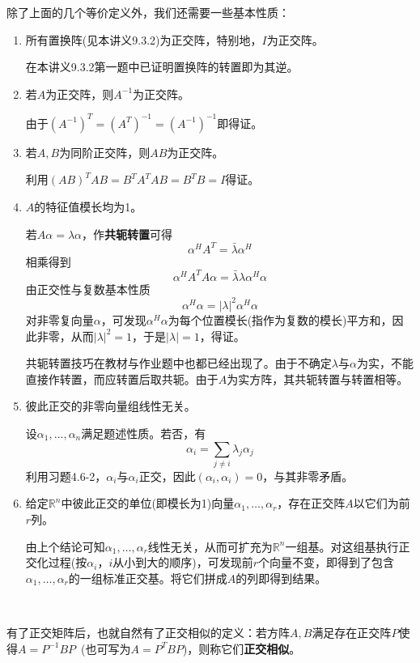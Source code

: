 \documentclass[a4paper,UTF8,fontset=windows]{ctexart}
\newcommand*{\note}{\noindent *}
\begin{document}
除了上面的几个等价定义外，我们还需要一些基本性质：
\begin{enumerate}
    \item 所有置换阵(见本讲义9.3.2)为正交阵，特别地，$I$为正交阵。
    
    在本讲义9.3.2第一题中已证明置换阵的转置即为其逆。

    \item 若$A$为正交阵，则$A^{-1}$为正交阵。
    
    由于$(A^{-1})^T=(A^T)^{-1}=(A^{-1})^{-1}$即得证。

    \item 若$A,B$为同阶正交阵，则$AB$为正交阵。
    
    利用$(AB)^TAB=B^TA^TAB=B^TB=I$得证。

    \item $A$的特征值模长均为1。
    
    若$A\alpha=\lambda\alpha$，作\textbf{共轭转置}可得
    $$\alpha^HA^T=\bar{\lambda}\alpha^H$$
    相乘得到
    $$\alpha^HA^TA\alpha=\bar{\lambda}\lambda\alpha^H\alpha$$
    由正交性与复数基本性质
    $$\alpha^H\alpha=|\lambda|^2\alpha^H\alpha$$
    对非零复向量$\alpha$，可发现$\alpha^H\alpha$为每个位置模长(指作为复数的模长)平方和，因此非零，从而$|\lambda|^2=1$，于是$|\lambda|=1$，得证。

    \note 共轭转置技巧在教材与作业题中也都已经出现了。由于不确定$\lambda$与$\alpha$为实，不能直接作转置，而应转置后取共轭。由于$A$为实方阵，其共轭转置与转置相等。

    \item 彼此正交的非零向量组线性无关。
    
    设$\alpha_1,\dots,\alpha_n$满足题述性质。若否，有
    $$\alpha_i=\sum_{j\ne i}\lambda_j\alpha_j$$
    利用习题4.6-2，$\alpha_i$与$\alpha_i$正交，因此$(\alpha_i,\alpha_i)=0$，与其非零矛盾。

    \item 给定$\mathbb{R}^n$中彼此正交的单位(即模长为1)向量$\alpha_1,\dots,\alpha_r$，存在正交阵$A$以它们为前$r$列。
    
    由上个结论可知$\alpha_1,\dots,\alpha_r$线性无关，从而可扩充为$\mathbb{R}^n$一组基。对这组基执行正交化过程(按$\alpha_i$，$i$从小到大的顺序)，可发现前$r$个向量不变，即得到了包含$\alpha_1,\dots,\alpha_r$的一组标准正交基。将它们拼成$A$的列即得到结果。
\end{enumerate}

\

有了正交矩阵后，也就自然有了正交相似的定义：若方阵$A,B$满足存在正交阵$P$使得$A=P^{-1}BP$\ (也可写为$A=P^TBP$)，则称它们\textbf{正交相似}。
\end{document}
